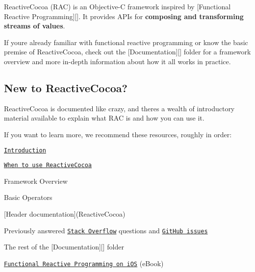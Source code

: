 Reactive\+Cocoa (R\+AC) is an Objective-\/C framework inspired by \mbox{[}Functional Reactive Programming\mbox{]}\mbox{[}\mbox{]}. It provides A\+P\+Is for {\bfseries composing and transforming streams of values}.

If you\textquotesingle{}re already familiar with functional reactive programming or know the basic premise of Reactive\+Cocoa, check out the \mbox{[}Documentation\mbox{]}\mbox{[}\mbox{]} folder for a framework overview and more in-\/depth information about how it all works in practice.

\subsection*{New to Reactive\+Cocoa?}

Reactive\+Cocoa is documented like crazy, and there\textquotesingle{}s a wealth of introductory material available to explain what R\+AC is and how you can use it.

If you want to learn more, we recommend these resources, roughly in order\+:


\begin{DoxyEnumerate}
\item \href{#introduction}{\tt Introduction}
\end{DoxyEnumerate}
\begin{DoxyEnumerate}
\item \href{#when-to-use-reactivecocoa}{\tt When to use Reactive\+Cocoa}
\end{DoxyEnumerate}
\begin{DoxyEnumerate}
\item Framework Overview
\end{DoxyEnumerate}
\begin{DoxyEnumerate}
\item Basic Operators
\end{DoxyEnumerate}
\begin{DoxyEnumerate}
\item \mbox{[}Header documentation\mbox{]}(Reactive\+Cocoa)
\end{DoxyEnumerate}
\begin{DoxyEnumerate}
\item Previously answered \href{https://github.com/ReactiveCocoa/ReactiveCocoa/wiki}{\tt Stack Overflow} questions and \href{https://github.com/ReactiveCocoa/ReactiveCocoa/issues?labels=question&state=closed}{\tt Git\+Hub issues}
\end{DoxyEnumerate}
\begin{DoxyEnumerate}
\item The rest of the \mbox{[}Documentation\mbox{]}\mbox{[}\mbox{]} folder
\end{DoxyEnumerate}
\begin{DoxyEnumerate}
\item \href{https://leanpub.com/iosfrp/}{\tt Functional Reactive Programming on i\+OS} (e\+Book)
\end{DoxyEnumerate}

